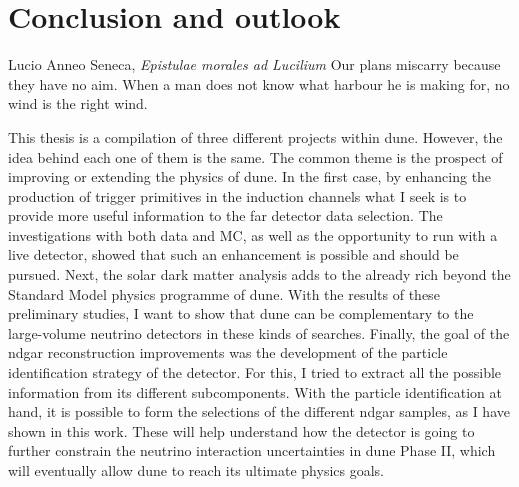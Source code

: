 \chapter{Conclusion and outlook}
\label{chapter:conclusion}

\begin{chapquote}{Lucio Anneo Seneca, \textit{Epistulae morales ad Lucilium}}
    Our plans miscarry because they have no aim. When a man does not know what harbour he is making for, no wind is the right wind.
\end{chapquote}

This thesis is a compilation of three different projects within \gls{dune}. However, the idea behind each one of them is the same. The common theme is the prospect of improving or extending the physics of \gls{dune}. In the first case, by enhancing the production of trigger primitives in the induction channels what I seek is to provide more useful information to the far detector data selection. The investigations with both data and MC, as well as the opportunity to run with a live detector, showed that such an enhancement is possible and should be pursued. Next, the solar dark matter analysis adds to the already rich beyond the Standard Model physics programme of \gls{dune}. With the results of these preliminary studies, I want to show that \gls{dune} can be complementary to the large-volume neutrino detectors in these kinds of searches. Finally, the goal of the \gls{ndgar} reconstruction improvements was the development of the particle identification strategy of the detector. For this, I tried to extract all the possible information from its different subcomponents. With the particle identification at hand, it is possible to form the selections of the different \gls{ndgar} samples, as I have shown in this work. These will help understand how the detector is going to further constrain the neutrino interaction uncertainties in \gls{dune} Phase II, which will eventually allow \gls{dune} to reach its ultimate physics goals.

